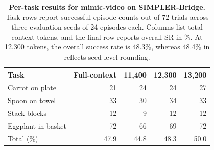 \begin{table}[!tbp]
  \centering
  \caption{\textbf{Per-task results for mimic-video on SIMPLER-Bridge.}
  Task rows report successful episode counts out of 72 trials across three evaluation seeds of 24 episodes each.
  Columns list total context tokens, and the final row reports overall SR in \%.
  At 12,300 tokens, the overall success rate is 48.3\%, whereas 48.4\% in  reflects seed-level rounding.
  }
  \label{tab:supp_pertask_bridge}
  \scriptsize
  \setlength{\tabcolsep}{3pt}
  \renewcommand{\arraystretch}{0.98}
\begin{tabular}{@{}lrrrr@{}}
    \toprule
    Task & Full-context & 11,400 & 12,300 & 13,200 \\
    \midrule
    Carrot on plate & 21 & 24 & 24 & 27 \\
    Spoon on towel & 33 & 30 & 34 & 33 \\
    Stack blocks & 12 & 9 & 12 & 12 \\
    Eggplant in basket & 72 & 66 & 69 & 72 \\
    \midrule
    Total (\%) & 47.9 & 44.8 & 48.3 & 50.0 \\
    \bottomrule
  \end{tabular}
\end{table}

